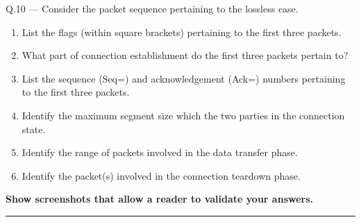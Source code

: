 \documentclass{article}
\newcommand\Que[2]{%
   \begin{samepage}
   \leavevmode\par
   \noindent
   Q.#1 --- #2\par\vspace{10pt}\hrule\vspace{10pt}
   \end{samepage}}
\begin{document}
\Que{10}{
Consider the packet sequence pertaining to the lossless case.
\begin{enumerate}
\item List the flags (within square brackets) pertaining to the
      first three packets.
\item What part of connection establishment do the first three
      packets pertain to?
\item List the sequence (Seq=) and acknowledgement (Ack=) numbers
      pertaining to the first three packets.
\item Identify the maximum segment size which the two parties in
      the connection state.
\item Identify the range of packets involved in the data transfer
      phase.
\item Identify the packet(s) involved in the connection teardown
      phase.
\end{enumerate}

\textbf{Show screenshots that allow a reader to validate your answers.}}
\end{document}
